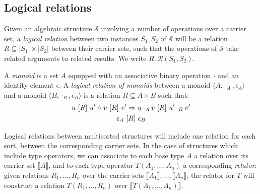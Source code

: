 \subsection{Logical relations}

Given an algebraic structure $\mathcal{S}$
involving a number of operations over a carrier set,
a \emph{logical relation}
between two instances $S_1, S_2$ of $\mathcal{S}$
will be a relation $R \subseteq |S_1| \times |S_2|$
between their carrier sets,
such that the operations of $\mathcal{S}$
take related arguments to related results.
We write $R : \mathcal{R}(S_1, S_2)$.

\begin{example}
\label{ex:monoid}
A \emph{monoid} is a set $A$ equipped with
an associative binary operation $\cdot$ and
an identity element $\epsilon$.
A \emph{logical relation of monoids} between
a monoid $\langle A, \cdot_A, \epsilon_A \rangle$ and
a monoid $\langle B, \cdot_B, \epsilon_B \rangle$
is a relation $R \subseteq A \times B$
such that:
\begin{gather*}
u \ [{R}]\  u' \wedge v \ [{R}]\  v' \Rightarrow u \cdot_A v \ [{R}]\  u' \cdot_B v' \\
\epsilon_A \ [{R}]\  \epsilon_B
\end{gather*}
\end{example}

Logical relations between multisorted structures
will include one relation for each sort,
between the corresponding carrier sets.
In the case of structures which include type operators,
we can associate to each base type $A$
a relation over its carrier set $\llbracket A \rrbracket$,
and to each type operator $T(A_1, \ldots, A_n)$
a corresponding \emph{relator}:
given relations $R_1, \ldots, R_n$ over
the carrier sets $\llbracket A_1 \rrbracket, \ldots, \llbracket A_n \rrbracket$,
the relator for $T$
will construct a relation $T(R_1, \ldots, R_n)$
over $\llbracket T(A_1, \ldots, A_n) \rrbracket$.

